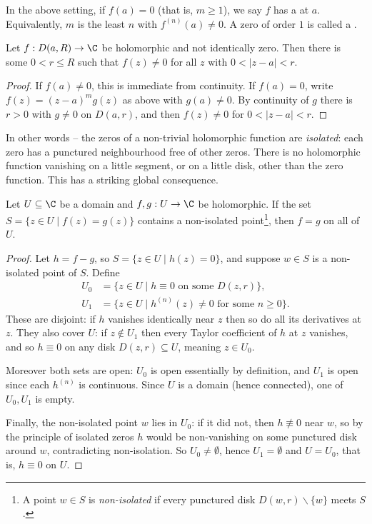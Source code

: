 \begin{definition}
    In the above setting, if $f(a) = 0$ (that is, $m \geq 1$), we say $f$ has a  at $a$. Equivalently, $m$ is the least $n$ with $f^{(n)}(a) \neq 0$. A zero of order $1$ is called a .
\end{definition}

\begin{theorem}
    Let $f: D(a, R) \rightarrow \C$ be holomorphic and not identically zero. Then there is some $0 < r \leq R$ such that $f(z) \neq 0$ for all $z$ with $0 < |z - a| < r$.
\end{theorem}
\begin{proof}
    If $f(a) \neq 0$, this is immediate from continuity. If $f(a) = 0$, write $f(z) = (z - a)^m g(z)$ as above with $g(a) \neq 0$. By continuity of $g$ there is $r > 0$ with $g \neq 0$ on $D(a, r)$, and then $f(z) \neq 0$ for $0 < |z - a| < r$.
\end{proof}

In other words -- the zeros of a non-trivial holomorphic function are \emph{isolated}: each zero has a punctured neighbourhood free of other zeros. There is no holomorphic function vanishing on a little segment, or on a little disk, other than the zero function. This has a striking global consequence.

\begin{theorem}
    Let $U \subseteq \C$ be a domain and $f, g: U \rightarrow \C$ be holomorphic. If the set $S = \{z \in U \mid f(z) = g(z)\}$ contains a non-isolated point\footnote{A point $w \in S$ is \emph{non-isolated} if every punctured disk $D(w, r) \backslash \{w\}$ meets $S$.}, then $f = g$ on all of $U$.
\end{theorem}
\begin{proof}
    Let $h = f - g$, so $S = \{z \in U \mid h(z) = 0\}$, and suppose $w \in S$ is a non-isolated point of $S$. Define
    \begin{align*}
    U_0 &= \{z \in U \mid h \equiv 0 \text{ on some } D(z, r)\}, \\
    U_1 &= \{z \in U \mid h^{(n)}(z) \neq 0 \text{ for some } n \geq 0\}.
    \end{align*}
    These are disjoint: if $h$ vanishes identically near $z$ then so do all its derivatives at $z$. They also cover $U$: if $z \notin U_1$ then every Taylor coefficient of $h$ at $z$ vanishes, and so $h \equiv 0$ on any disk $D(z, r) \subseteq U$, meaning $z \in U_0$.

    Moreover both sets are open: $U_0$ is open essentially by definition, and $U_1$ is open since each $h^{(n)}$ is continuous. Since $U$ is a domain (hence connected), one of $U_0, U_1$ is empty.

    Finally, the non-isolated point $w$ lies in $U_0$: if it did not, then $h \not\equiv 0$ near $w$, so by the principle of isolated zeros $h$ would be non-vanishing on some punctured disk around $w$, contradicting non-isolation. So $U_0 \neq \emptyset$, hence $U_1 = \emptyset$ and $U = U_0$, that is, $h \equiv 0$ on $U$.
\end{proof}

